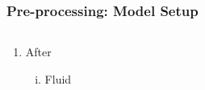 \documentclass[10pt,compress, unknownkeysallowed]{beamer}
\begin{document}
\begin{frame}
  \frametitle{Pre-processing: Model Setup}
    \begin{columns}
        \begin{column}[l]{0.5\linewidth}
           \begin{enumerate}\scriptsize
                \item<1-> After 
                    \begin{enumerate}[i)]\scriptsize
                       \item<2-> Fluid 
                   \end{enumerate}
           \end{enumerate}
        \end{column}
           \begin{column}[l]{0.5\linewidth}
           \end{column}
    \end{columns}
\end{frame}
\end{document}
